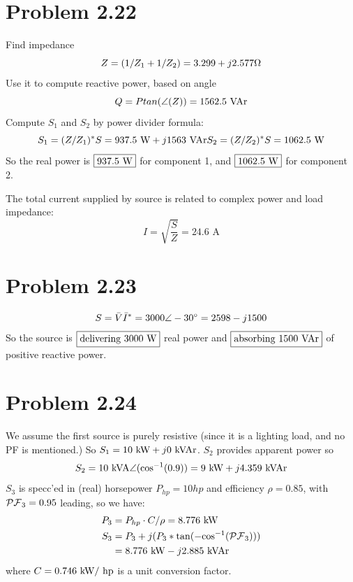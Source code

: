 \documentclass{homework}
\begin{document}
\section{Problem 2.22}
\begin{letterenum}
    \item Find impedance
    \begin{equation*}
        Z = (1/Z_1 + 1/Z_2) = 3.299 + j 2.577 \ohm
    \end{equation*}
    Use it to compute reactive power, based on angle
    \begin{equation*}
        Q = P tan(\angle(Z)) = 1562.5 \text{ VAr}
    \end{equation*}
    Compute $S_1$ and $S_2$ by power divider formula:
    \begin{equation*}
        S_1 = (Z / Z_1)^* S = 937.5 \text{ W} + j 1563 \text{ VAr}
        S_2 = (Z / Z_2)^* S = 1062.5 \text{ W}
    \end{equation*}
    So the real power is $\boxed{937.5 \text{ W}}$ for component 1,
    and $\boxed{1062.5 \text{ W}}$ for component 2.

    \item The total current supplied by source is related to
        complex power and load impedance:
    \begin{equation*}
        I = \sqrt{\frac{S}{Z}} = \boxed{24.6 \text{ A}}
    \end{equation*}
\end{letterenum}

\section{Problem 2.23}
\begin{equation*}
    S = \bar{V}\bar{I}^* = 3000 \angle -30 \degree = 2598 - j1500
\end{equation*}
So the source is $\boxed{$delivering 3000 W$}$ real power and $\boxed{$absorbing
1500 VAr$}$ of positive reactive power.

\section{Problem 2.24}
We assume the first source is purely resistive (since it is a lighting
load, and no PF is mentioned.) So $S_1 = 10 \text{ kW} + j0 \text{ kVAr}$.
$S_2$ provides apparent power so
\begin{equation*}
    S_2 = 10 \text{ kVA} \angle(\text{cos}^{-1}(0.9)) = 9 \text{ kW} + j4.359 \text{ kVAr}
\end{equation*}
$S_3$ is specc'ed in (real) horsepower $P_{hp} = 10 hp$ and
efficiency $\rho = 0.85$, with $\mathcal{PF}_3 = 0.95$ leading, so we have:
\begin{align*}
    P_3 &= P_{hp} \cdot C / \rho = 8.776 \text{ kW} \\
    S_3 &= P_3 + j (P_3 * \tan(- \text{cos}^{-1}(\mathcal{PF}_3))) \\
        &= 8.776 \text{ kW} - j 2.885 \text{ kVAr}
\end{align*}
where $C = 0.746 \text{ kW} / \text{ hp}$ is a unit conversion factor.
\end{document}
